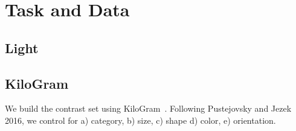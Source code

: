 \section{Task and Data}
\label{sec:task_data}

\subsection{Light}


\subsection{KiloGram}

We build the contrast set using KiloGram~\cite{ji-etal-2022-abstract}.
Following Pustejovsky and Jezek 2016, we control for a) category, b) size, c) shape d) color, e) orientation.

